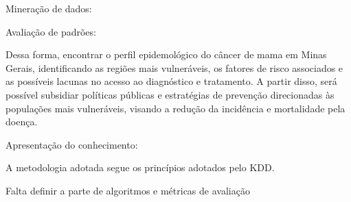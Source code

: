 Mineração de dados:



Avaliação de padrões: 

Dessa forma, encontrar o perfil epidemológico do câncer de mama em Minas Gerais, identificando as regiões mais vulneráveis, os fatores de risco associados e as possíveis lacunas no acesso ao diagnóstico e tratamento. A partir disso, será possível subsidiar políticas públicas e estratégias de prevenção direcionadas às populações mais vulneráveis, visando a redução da incidência e mortalidade pela doença.

Apresentação do conhecimento:

A metodologia adotada segue os princípios adotados pelo KDD.


Falta definir a parte de algoritmos e métricas de avaliação


